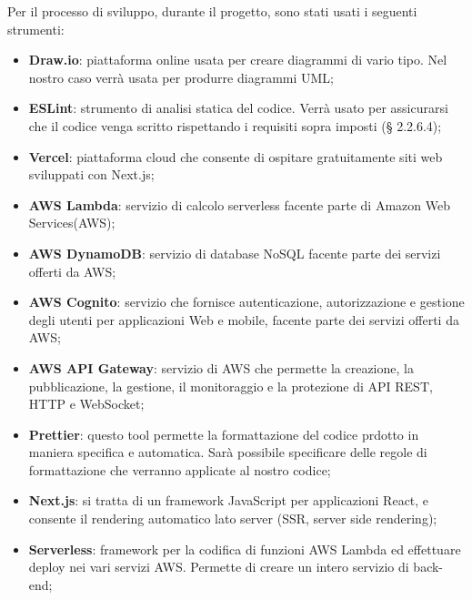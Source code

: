 Per il processo di sviluppo, durante il progetto, sono stati usati i seguenti strumenti:
\begin{itemize}
\item \textbf{Draw.io}: piattaforma online usata per creare diagrammi di vario tipo. Nel nostro caso verrà usata per produrre diagrammi UML;
\item \textbf{ESLint}: strumento di analisi statica del codice. Verrà usato per assicurarsi che il codice venga scritto rispettando i requisiti sopra imposti (§ 2.2.6.4);
\item \textbf{Vercel}: piattaforma cloud che consente di ospitare gratuitamente siti web sviluppati con Next.js;
\item \textbf{AWS Lambda}: servizio di calcolo serverless facente parte di Amazon Web Services(AWS);
\item \textbf{AWS DynamoDB}: servizio di database NoSQL facente parte dei servizi offerti da AWS;
\item \textbf{AWS Cognito}: servizio che fornisce autenticazione, autorizzazione e gestione degli utenti per applicazioni Web e mobile, facente parte dei servizi offerti da AWS;
\item \textbf{AWS API Gateway}: servizio di AWS che permette la creazione, la pubblicazione, la gestione, il monitoraggio e la protezione di API REST, HTTP e WebSocket;
\item \textbf{Prettier}: questo tool permette la formattazione del codice prdotto in maniera specifica e automatica. Sarà possibile specificare delle regole di formattazione che verranno applicate al nostro codice;
\item \textbf{Next.js}: si tratta di un framework JavaScript per applicazioni React, e consente il rendering automatico lato server (SSR, server side rendering);
\item \textbf{Serverless}: framework per la codifica di funzioni AWS Lambda ed effettuare deploy nei vari servizi AWS. Permette di creare un intero servizio di back-end;
\end{itemize} 